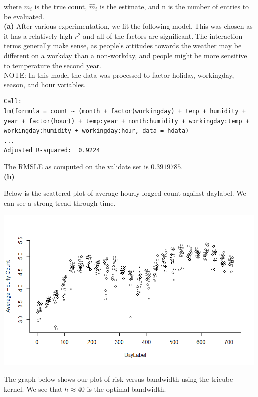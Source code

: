 \documentclass[12pt]{article}
\begin{document}
where $m_i$
is the true count, $\hat{m}_i$
is the estimate, and n is the number of entries to be evaluated.\\

\textbf{(a)} After various experimentation, we fit the following model. This was chosen as it has a relatively high $r^2$ and all of the factors are significant. The interaction terms generally make sense, as people's attitudes towards the weather may be different on a workday than a non-workday, and people might be more sensitive to temperature the second year. \\ 

NOTE: In this model the data was processed to factor holiday, workingday, season, and hour variables.

\begin{verbatim}
Call:
lm(formula = count ~ (month + factor(workingday) + temp + humidity + 
year + factor(hour)) + temp:year + month:humidity + workingday:temp + 
workingday:humidity + workingday:hour, data = hdata)
...
Adjusted R-squared:  0.9224 
\end{verbatim}

The RMSLE as computed on the validate set is $0.3919785$.\\

\textbf{(b)}

Below is the scattered plot of average hourly logged count against daylabel. We can see a strong trend through time.

\includegraphics[scale=0.5]{daylabel_avg}

The graph below shows our plot of risk versus bandwidth using the tricube kernel. We see that $h\approx 40$ is the optimal bandwidth.
\end{document}
